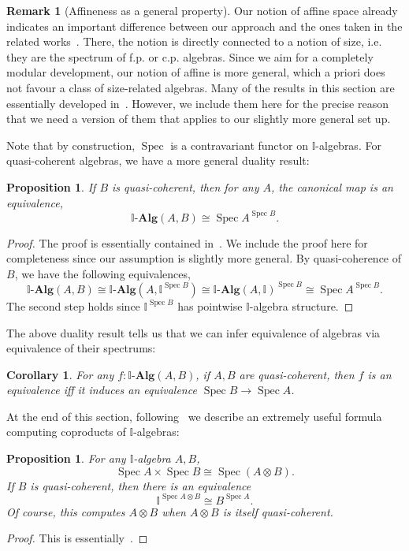\documentclass[12pt]{amsart}
\newtheorem{corollary}[theorem]{Corollary}
\newtheorem{proposition}[theorem]{Proposition}
\theoremstyle{definition}
\newtheorem{remark}[theorem]{Remark}
\newcommand{\mb}[1]{\mathbf{#1}}
\newcommand{\mbb}[1]{\mathbb{#1}}
\newcommand{\I}{\mbb I}
\newcommand{\alg}{\text{-}\mb{Alg}}
\newcommand{\spec}{\operatorname{Spec}}
\begin{document}
\begin{remark}[Affineness as a general property]
  Our notion of affine space already indicates an important difference between our approach and the ones taken in the related works~\cite{Cherubini_Coquand_Hutzler_2024,cherubini2024foundation}. There, the notion is directly connected to a notion of size, i.e. they are the spectrum of f.p. or c.p. algebras. Since we aim for a completely modular development, our notion of affine is more general, which a priori does not favour a class of size-related algebras. Many of the results in this section are essentially developed in~\cite{Cherubini_Coquand_Hutzler_2024}. However, we include them here for the precise reason that we need a version of them that applies to our slightly more general set up.
\end{remark}

Note that by construction, $\spec$ is a contravariant functor on $\I$-algebras. For quasi-coherent algebras, we have a more general duality result:

\begin{proposition}\label{prop:duality}
  If $B$ is quasi-coherent, then for any $A$, the canonical map is an equivalence,
  \[ \I\alg(A,B) \cong \spec A^{\spec B}. \]
\end{proposition}
\begin{proof}
  The proof is essentially contained in~\cite[Prop. 2.2.1]{Cherubini_Coquand_Hutzler_2024}. We include the proof here for completeness since our assumption is slightly more general. By quasi-coherence of $B$, we have the following equivalences,
  \[ \I\alg(A,B) \cong \I\alg(A,\I^{\spec B}) \cong \I\alg(A,\I)^{\spec B} \cong \spec A^{\spec B}. \]
  The second step holds since $\I^{\spec B}$ has pointwise $\I$-algebra structure.
\end{proof}

The above duality result tells us that we can infer equivalence of algebras via equivalence of their spectrums:

\begin{corollary}\label{cor:dualityeqv}
  For any $f : \I\alg(A,B)$, if $A,B$ are quasi-coherent, then $f$ is an equivalence iff it induces an equivalence $\spec B \to \spec A$. 
\end{corollary}

At the end of this section, following~\cite{Cherubini_Coquand_Hutzler_2024} we describe an extremely useful formula computing coproducts of $\I$-algebras:

\begin{proposition}\label{prop:tensorasspace}
  For any $\I$-algebra $A,B$, 
  \[ \spec A \times \spec B \cong \spec(A \otimes B). \]
  If $B$ is quasi-coherent, then there is an equivalence
  \[ \I^{\spec A \otimes B} \cong B^{\spec A}. \]
  Of course, this computes $A \otimes B$ when $A \otimes B$ is itself quasi-coherent.
\end{proposition}
\begin{proof}
  This is essentially~\cite[Lem. 3.2.1 \& Lem. 3.3.1]{Cherubini_Coquand_Hutzler_2024}.
\end{proof}
\end{document}

